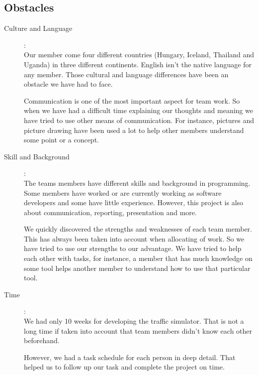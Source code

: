 \documentclass[11pt]{article}
\begin{document}
\subsection{Obstacles}
\begin{description}
\item[Culture and Language]:\\
Our member come four different countries (Hungary, Iceland, Thailand  and Uganda) in three different continents. English isn't the native language for any member. Those cultural and language differences have been an obstacle we have had to face.

Communication is one of the most important aspect for team work. So when we have had a difficult time explaining our thoughts and meaning we have tried to use other means of communication. For instance, pictures and picture drawing have been used a lot to help other members understand some point or a concept.
    
\item[Skill and Background]:\\
The teams members have different skills and background in programming. Some members have worked or are currently working as software developers and some have little experience. However, this project is also about communication, reporting, presentation and more.

We quickly discovered the strengths and weaknesses of each team member. This has always been taken into account when allocating of work. So we have tried to use our strengths to our advantage. We have tried to help each other with tasks, for instance, a member that has much knowledge on some tool helps another member to understand how to use that particular tool. 

\item[Time]:\\
We had only 10 weeks for developing the traffic simulator. That is not a long time if taken into account that team members didn't know each other beforehand.

However, we had a task schedule for each person in deep detail. That helped us to follow up our task and complete the project on time. 
\end{description}

	
\newpage
\end{document}
